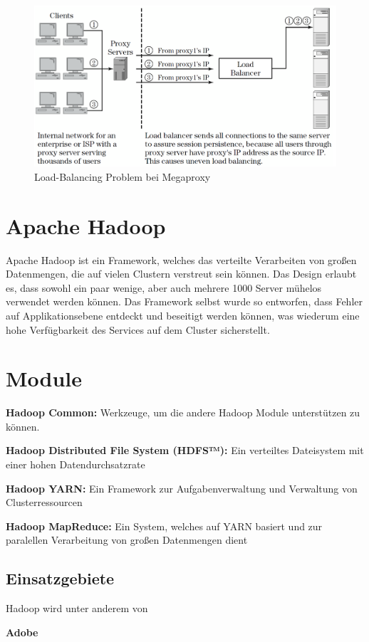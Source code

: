 \begin{figure}[!h]
	\begin{center}
		\includegraphics[width=0.5\linewidth]{images/MegaProxy2.png}
		\caption{Load-Balancing Problem bei Megaproxy \cite{LoadBalancing2}}
		\label{Load-Balancing_Problem_bei_Megaproxy}
	\end{center}
\end{figure}

\section{Apache Hadoop}
\label{sec:Apache Hadoop}
Apache Hadoop ist ein Framework, welches das verteilte Verarbeiten von großen Datenmengen, die auf vielen Clustern verstreut sein können. Das Design erlaubt es, dass sowohl ein paar wenige, aber auch mehrere 1000 Server mühelos verwendet werden können. Das Framework selbst wurde so entworfen, dass Fehler auf Applikationsebene entdeckt und beseitigt werden können, was wiederum eine hohe Verfügbarkeit des Services auf dem Cluster sicherstellt.

\section{Module}
\label{sec:Module}
\textbf{Hadoop Common:} Werkzeuge, um die andere Hadoop Module unterstützen zu können.

\textbf{Hadoop Distributed File System (HDFS™):} Ein verteiltes Dateisystem mit einer hohen Datendurchsatzrate

\textbf{Hadoop YARN:} Ein Framework zur Aufgabenverwaltung und Verwaltung von Clusterressourcen

\textbf{Hadoop MapReduce: } Ein System, welches auf YARN basiert und zur paralellen Verarbeitung von großen Datenmengen dient

\subsection{Einsatzgebiete}
\label{sec:Einsatzgebiete}
Hadoop wird unter anderem von

\textbf{Adobe}

